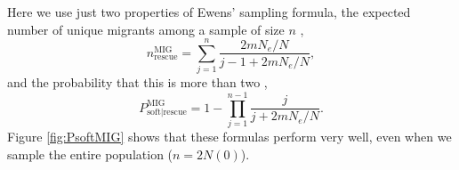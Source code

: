 \documentclass[]{article}
\begin{document}
Here we use just two properties of Ewens' sampling formula, the expected number of unique migrants among a sample of size $n$ \citep[page 336 in][]{ewens2004mathematical},
\begin{equation}\label{eq:ewens_number}
n^\mathrm{MIG}_\mathrm{rescue} = \sum_{j=1}^n \frac{2 m N_e/N}{j - 1 + 2 m N_e/N},
\end{equation}
and the probability that this is more than two \citep[equation 10.9 in][]{ewens2004mathematical},
\begin{equation}\label{eq:ewens_Psoft}
P_{\mathrm{soft}|\mathrm{rescue}}^\mathrm{MIG} = 1 - \prod_{j=1}^{n-1} \frac{j}{j + 2 m N_e/N}.
\end{equation}
Figure \ref{fig:PsoftMIG} shows that these formulas perform very well, even when we sample the entire population ($n=2N(0)$).
\end{document}
